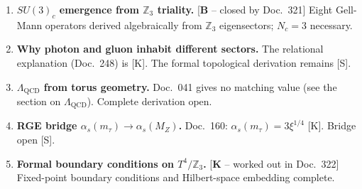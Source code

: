 \begin{enumerate}
  \item \textbf{$SU(3)_c$ emergence from $\mathbb{Z}_3$ triality.}
    [\textbf{B} -- closed by Doc.~321] Eight Gell-Mann operators derived
    algebraically from $\mathbb{Z}_3$ eigensectors; $N_c=3$ necessary.
  \item \textbf{Why photon and gluon inhabit different sectors.}
    The relational explanation (Doc.~248) is [K]. The formal
    topological derivation remains [S].
  \item \textbf{$\Lambda_\text{QCD}$ from torus geometry.}
    Doc.~041 gives no matching value (see the section on $\Lambda_\text{QCD}$). Complete derivation open.
  \item \textbf{RGE bridge $\alpha_s(m_\tau)\to\alpha_s(M_Z)$.}
    Doc.~160: $\alpha_s(m_\tau)=3\xi^{1/4}$ [K]. Bridge open [S].
  \item \textbf{Formal boundary conditions on $T^4/\mathbb{Z}_3$.}
    [\textbf{K} -- worked out in Doc.~322] Fixed-point boundary conditions
    and Hilbert-space embedding complete.
\end{enumerate}
